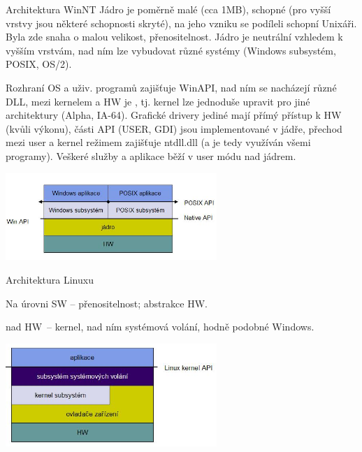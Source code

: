\begin{obecne}{Architektura WinNT}
  Jádro je poměrně malé (cca 1MB), schopné (pro vyšší vrstvy jsou některé schopnosti skryté), na jeho vzniku se podíleli schopní Unixáři. Byla zde snaha o malou velikost, přenositelnost. Jádro je neutrální vzhledem k vyšším vrstvám, nad ním lze vybudovat různé systémy (Windows subsystém, POSIX, OS/2).

  Rozhraní OS a uživ. programů zajišťuje WinAPI, nad ním se nacházejí různé DLL, mezi kernelem a HW je , tj. kernel lze jednoduše upravit pro jiné architektury (Alpha, IA-64).
  Grafické drivery jediné mají přímý přístup k HW (kvůli výkonu), části API (USER, GDI) jsou implementované v jádře, přechod mezi user a kernel režimem zajišťuje ntdll.dll (a je tedy využíván všemi programy). Veškeré služby a aplikace běží v user módu nad jádrem.

  \begin{center}
    \includegraphics[width=8cm]{informatika/operacne_systemy_a_hw/obrazky/arch-windows.jpg}
  \end{center}
\end{obecne}

\begin{obecne}{Architektura Linuxu}
  \begin{pitemize}
      \item Na úrovni SW -- přenositelnost; abstrakce HW. 
      \item nad HW~-- kernel, nad ním systémová volání, hodně podobné Windows.
  \end{pitemize}

  \begin{center}
    \includegraphics[width=8cm]{informatika/operacne_systemy_a_hw/obrazky/arch-linux.jpg}
  \end{center}
\end{obecne}
